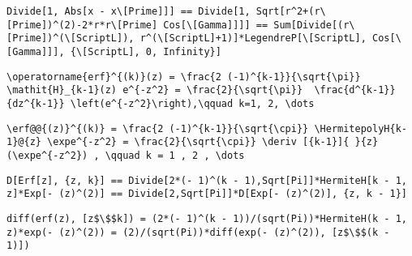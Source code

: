 \newsavebox\AKMM
\begin{lrbox}{\AKMM}
 \begin{minipage}[t]{0.82\textwidth}
  \lstinline[language={[latex]TeX},mathescape,breaklines=true]"Divide[1, Abs[x - x\[Prime]]] == Divide[1, Sqrt[r^2+(r\[Prime])^(2)-2*r*r\[Prime] Cos[\[Gamma]]]] == Sum[Divide[(r\[Prime])^(\[ScriptL]), r^(\[ScriptL]+1)]*LegendreP[\[ScriptL], Cos[\[Gamma]]], {\[ScriptL], 0, Infinity}]"
 \end{minipage}
\end{lrbox}
\newsavebox\AKMA
\begin{lrbox}{\AKMA}
 \begin{minipage}[t]{0.82\textwidth}
  \lstinline[language={[latex]TeX},mathescape,breaklines=true]""
 \end{minipage}
\end{lrbox}
\newsavebox\ALT
\begin{lrbox}{\ALT}
 \begin{minipage}[t]{0.82\textwidth}
  \lstinline[language={[latex]TeX},mathescape,breaklines=true]"\operatorname{erf}^{(k)}(z) = \frac{2 (-1)^{k-1}}{\sqrt{\pi}} \mathit{H}_{k-1}(z) e^{-z^2} = \frac{2}{\sqrt{\pi}}  \frac{d^{k-1}}{dz^{k-1}} \left(e^{-z^2}\right),\qquad k=1, 2, \dots"
 \end{minipage}
\end{lrbox}
\newsavebox\ALST
\begin{lrbox}{\ALST}
 \begin{minipage}[t]{0.82\textwidth}
  \lstinline[language={[latex]TeX},mathescape,breaklines=true]"\erf@@{(z)}^{(k)} = \frac{2 (-1)^{k-1}}{\sqrt{\cpi}} \HermitepolyH{k-1}@{z} \expe^{-z^2} = \frac{2}{\sqrt{\cpi}} \deriv [{k-1}]{ }{z}(\expe^{-z^2}) , \qquad k = 1 , 2 , \dots"
 \end{minipage}
\end{lrbox}
\newsavebox\ALMM
\begin{lrbox}{\ALMM}
 \begin{minipage}[t]{0.82\textwidth}
  \lstinline[language={[latex]TeX},mathescape,breaklines=true]"D[Erf[z], {z, k}] == Divide[2*(- 1)^(k - 1),Sqrt[Pi]]*HermiteH[k - 1, z]*Exp[- (z)^(2)] == Divide[2,Sqrt[Pi]]*D[Exp[- (z)^(2)], {z, k - 1}]"
 \end{minipage}
\end{lrbox}
\newsavebox\ALMA
\begin{lrbox}{\ALMA}
 \begin{minipage}[t]{0.82\textwidth}
  \lstinline[language={[latex]TeX},mathescape,breaklines=true]"diff(erf(z), [z$\$$k]) = (2*(- 1)^(k - 1))/(sqrt(Pi))*HermiteH(k - 1, z)*exp(- (z)^(2)) = (2)/(sqrt(Pi))*diff(exp(- (z)^(2)), [z$\$$(k - 1)])"
 \end{minipage}
\end{lrbox}
